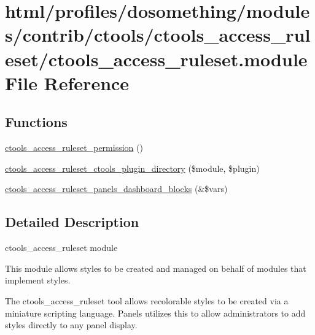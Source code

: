 \hypertarget{ctools__access__ruleset_8module}{
\section{html/profiles/dosomething/modules/contrib/ctools/ctools\_\-access\_\-ruleset/ctools\_\-access\_\-ruleset.module File Reference}
\label{ctools__access__ruleset_8module}
}
\subsection*{Functions}
\begin{DoxyCompactItemize}
\item 
\hyperlink{ctools__access__ruleset_8module_a14ebe62d97136a533948fa71657f62ad}{ctools\_\-access\_\-ruleset\_\-permission} ()
\item 
\hyperlink{ctools__access__ruleset_8module_a0640f3df46d163f89a3e393ecf665a3a}{ctools\_\-access\_\-ruleset\_\-ctools\_\-plugin\_\-directory} (\$module, \$plugin)
\item 
\hyperlink{ctools__access__ruleset_8module_ac7795e49e86c81fe209bcd0336701c41}{ctools\_\-access\_\-ruleset\_\-panels\_\-dashboard\_\-blocks} (\&\$vars)
\end{DoxyCompactItemize}


\subsection{Detailed Description}
ctools\_\-access\_\-ruleset module

This module allows styles to be created and managed on behalf of modules that implement styles.

The ctools\_\-access\_\-ruleset tool allows recolorable styles to be created via a miniature scripting language. Panels utilizes this to allow administrators to add styles directly to any panel display. 

